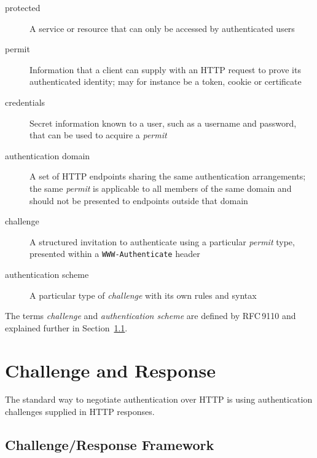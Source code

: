 \documentclass[11pt,a4paper]{ivoa}
\newcommand{\rfc}[1]{RFC\,#1}
\newcommand{\header}[1]{{\tt #1}}
\begin{document}
\begin{description}
\item[protected]
      A service or resource that can only be accessed by authenticated users
\item[permit]
      Information that a client can supply with an HTTP request to
      prove its authenticated identity;
      may for instance be a token, cookie or certificate
\item[credentials]
      Secret information known to a user, such as a username and password,
      that can be used to acquire a {\em permit}
\item[authentication domain]
      A set of HTTP endpoints sharing the same authentication arrangements;
      the same {\em permit\/} is applicable to all members of the same domain
      and should not be presented to endpoints outside that domain
\item[challenge]
      A structured invitation to authenticate using
      a particular {\em permit\/} type,
      presented within a \header{WWW-Authenticate} header
\item[authentication scheme]
      A particular type of {\em challenge\/} with its own rules and syntax
\end{description}
The terms {\em challenge\/} and {\em authentication scheme} are
defined by \rfc{9110}
and explained further in Section~\ref{sec:challenge-response}.


\section{Challenge and Response}

The standard way to negotiate authentication over HTTP is using 
authentication challenges supplied in HTTP responses.

\subsection{Challenge/Response Framework}
\label{sec:challenge-response}
\end{document}
